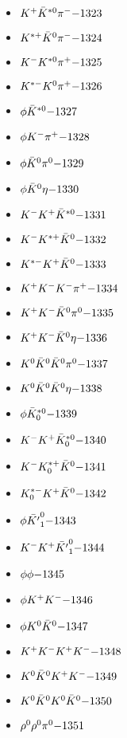 \begin{multicols}{3}
\begin{itemize}
 \item $ K^{+} \bar{K}^{*0} \pi^{-} \hfill{-1323}$
 \item $ K^{*+} \bar{K}^{0} \pi^{-} \hfill{-1324}$
 \item $ K^{-} K^{*0} \pi^{+} \hfill{-1325}$
 \item $ K^{*-} K^{0} \pi^{+} \hfill{-1326}$
 \item $ \phi \bar{K}^{*0} \hfill{-1327}$
 \item $ \phi K^{-} \pi^{+} \hfill{-1328}$
 \item $ \phi \bar{K}^{0} \pi^{0} \hfill{-1329}$
 \item $ \phi \bar{K}^{0} \eta \hfill{-1330}$
 \item $ K^{-} K^{+} \bar{K}^{*0} \hfill{-1331}$
 \item $ K^{-} K^{*+} \bar{K}^{0} \hfill{-1332}$
 \item $ K^{*-} K^{+} \bar{K}^{0} \hfill{-1333}$
 \item $ K^{+} K^{-} K^{-} \pi^{+} \hfill{-1334}$
 \item $ K^{+} K^{-} \bar{K}^{0} \pi^{0} \hfill{-1335}$
 \item $ K^{+} K^{-} \bar{K}^{0} \eta \hfill{-1336}$
 \item $ K^{0} \bar{K}^{0} \bar{K}^{0} \pi^{0} \hfill{-1337}$
 \item $ K^{0} \bar{K}^{0} \bar{K}^{0} \eta \hfill{-1338}$
 \item $ \phi \bar{K}_{0}^{*0} \hfill{-1339}$
 \item $ K^{-} K^{+} \bar{K}_{0}^{*0} \hfill{-1340}$
 \item $ K^{-} K_{0}^{*+} \bar{K}^{0} \hfill{-1341}$
 \item $ K_{0}^{*-} K^{+} \bar{K}^{0} \hfill{-1342}$
 \item $ \phi \bar{{K^{\prime}}}_{1}^{0} \hfill{-1343}$
 \item $ K^{-} K^{+} \bar{{K^{\prime}}}_{1}^{0} \hfill{-1344}$
 \item $ \phi \phi \hfill{-1345}$
 \item $ \phi K^{+} K^{-} \hfill{-1346}$
 \item $ \phi K^{0} \bar{K}^{0} \hfill{-1347}$
 \item $ K^{+} K^{-} K^{+} K^{-} \hfill{-1348}$
 \item $ K^{0} \bar{K}^{0} K^{+} K^{-} \hfill{-1349}$
 \item $ K^{0} \bar{K}^{0} K^{0} \bar{K}^{0} \hfill{-1350}$
 \item $ \rho^{0} \rho^{0} \pi^{0} \hfill{-1351}$

\end{itemize}
\end{multicols}
